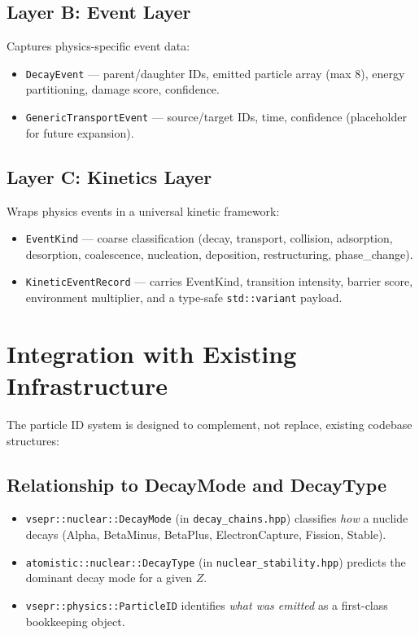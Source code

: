 \documentclass[11pt,a4paper]{article}
\begin{document}
\subsection{Layer B: Event Layer}

Captures physics-specific event data:

\begin{itemize}
    \item \texttt{DecayEvent} --- parent/daughter IDs, emitted particle array (max 8), energy partitioning, damage score, confidence.
    \item \texttt{GenericTransportEvent} --- source/target IDs, time, confidence (placeholder for future expansion).
\end{itemize}

\subsection{Layer C: Kinetics Layer}

Wraps physics events in a universal kinetic framework:

\begin{itemize}
    \item \texttt{EventKind} --- coarse classification (decay, transport, collision, adsorption, desorption, coalescence, nucleation, deposition, restructuring, phase\_change).
    \item \texttt{KineticEventRecord} --- carries EventKind, transition intensity, barrier score, environment multiplier, and a type-safe \texttt{std::variant} payload.
\end{itemize}

\section{Integration with Existing Infrastructure}
\label{sec:integration}

The particle ID system is designed to complement, not replace, existing codebase structures:

\subsection{Relationship to DecayMode and DecayType}

\begin{itemize}
    \item \texttt{vsepr::nuclear::DecayMode} (in \texttt{decay\_chains.hpp}) classifies \emph{how} a nuclide decays (Alpha, BetaMinus, BetaPlus, ElectronCapture, Fission, Stable).
    \item \texttt{atomistic::nuclear::DecayType} (in \texttt{nuclear\_stability.hpp}) predicts the dominant decay mode for a given $Z$.
    \item \texttt{vsepr::physics::ParticleID} identifies \emph{what was emitted} as a first-class bookkeeping object.
\end{itemize}
\end{document}
